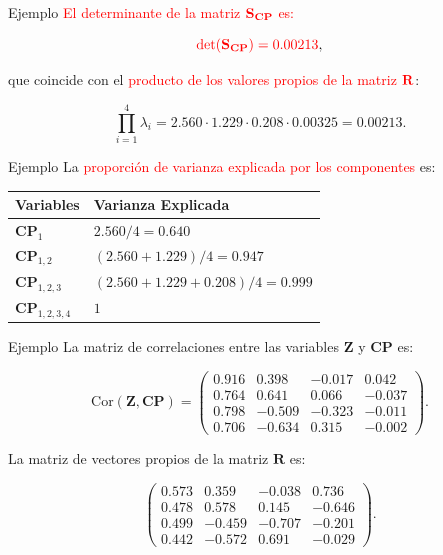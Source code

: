 \documentclass[
  ignorenonframetext,
]{beamer}
\begin{document}
\begin{frame}{Ejemplo}
\label{ejemplo-25}
\textcolor{red}{El determinante de la matriz}
\(\textcolor{red}{\mathbf{S}_{\mathbf{CP}}}\) \textcolor{red}{ es:}

\[\textcolor{red}{\det(\mathbf{S}_{\mathbf{CP}})=0.00213},\]

que coincide con el \textcolor{red}{producto de los
valores propios de la matriz} \(\textcolor{red}{\mathbf{R}}\):

\[
\prod_{i=1}^4\lambda_i= 2.560\cdot 1.229\cdot 0.208\cdot 0.00325 = 0.00213.
\]
\end{frame}

\begin{frame}{Ejemplo}
\label{ejemplo-26}
La \textcolor{red}{proporción de varianza explicada por los componentes}
es:

\begin{table}
\centering
\begin{tabular}{|l|l|}\hline
Variables&Varianza Explicada\\\hline
$\mathbf{CP}_1$&$2.560/4=0.640$\\\hline
$\mathbf{CP}_{1,2}$&$(2.560+1.229)/4=0.947$\\\hline
$\mathbf{CP}_{1,2,3}$&$(2.560+1.229+0.208)/4=0.999$\\\hline
$\mathbf{CP}_{1,2,3,4}$&$1$\\\hline
\end{tabular}
\end{table}
\end{frame}

\begin{frame}{Ejemplo}
\label{ejemplo-27}
La matriz de correlaciones entre las variables \(\mathbf{Z}\) y
\(\mathbf{CP}\) es:

\[
\mbox{Cor}(\mathbf{Z},\mathbf{CP}) =
\begin{pmatrix}
0.916 & 0.398 & -0.017 & 0.042 \\
 0.764 & 0.641 & 0.066 & -0.037 \\
 0.798 & -0.509 & -0.323 & -0.011 \\
 0.706 & -0.634 & 0.315 & -0.002 
\end{pmatrix}.
\]

La matriz de vectores propios de la matriz \(\mathbf{ R}\) es:

\[
\begin{pmatrix}
0.573 & 0.359 & -0.038 & 0.736 \\
 0.478 & 0.578 & 0.145 & -0.646 \\
 0.499 & -0.459 & -0.707 & -0.201 \\
 0.442 & -0.572 & 0.691 & -0.029
\end{pmatrix}.
\]
\end{frame}
\end{document}
